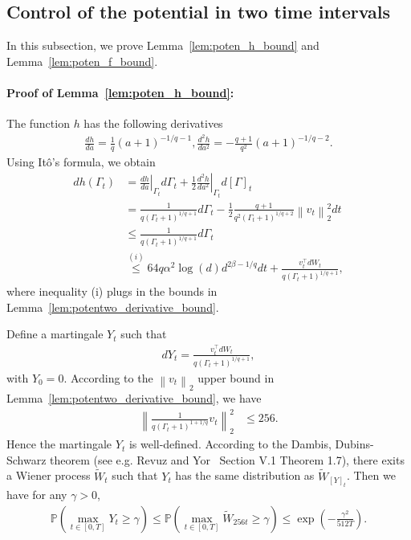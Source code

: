 \documentclass[11pt,twoside]{article}
\newcommand{\potentwo}{\Gamma}
\theoremstyle{named}
\theoremstyle{plain}
\newcommand{\vecnorm}[2]{\left\| #1\right\|_{#2}}
\newcommand{\Prob}{\ensuremath{{\mathbb{P}}}}
\newcommand{\usedim}{\ensuremath{d}}
\newcommand{\dims}{\usedim}
\newcommand{\brackets}[1]{\left[ #1 \right]}
\newcommand{\parenth}[1]{\left( #1 \right)}
\newcommand{\tp}{^\top}
\begin{document}
\subsection{Control of the potential in two time intervals} %
\label{sub:control_the_potential_in_two_time_periods}
In this subsection, we prove Lemma~\ref{lem:poten_h_bound} and Lemma~\ref{lem:poten_f_bound}.

\paragraph{Proof of Lemma~\ref{lem:poten_h_bound}:} The function $h$ has the following derivatives
\begin{align*}
  \frac{d h}{d a} = \frac{1}{q} \parenth{a + 1}^{-1/q - 1}, \frac{d^2 h}{da^2} = -\frac{q+1}{q^2} \parenth{a + 1}^{-1/q - 2}.
\end{align*}
Using It\^o's formula, we obtain
\begin{align*}
  d h(\potentwo_t) &= \left.\frac{d h}{d a}\right|_{\potentwo_t} d\potentwo_t + \frac{1}{2} \left.\frac{d^2 h}{d a^2}\right|_{\potentwo_t} d\brackets{\potentwo}_t \\
  &= \frac{1}{q (\potentwo_t+1)^{1/q+1}} d\potentwo_t - \frac{1}{2} \frac{q+1}{q^2 (\potentwo_t+1)^{1/q+2}} \vecnorm{v_t}{2}^2 dt \\
  &\leq \frac{1}{q (\potentwo_t+1)^{1/q+1}} d\potentwo_t \\
  &\stackrel{(i)}{\leq} 64 q \alpha^2 \log(\dims) \dims^{2\beta-1/q} dt + \frac{v_t\tp dW_t}{q \parenth{\potentwo_t + 1}^{1/q+1}},
\end{align*}
where inequality (i) plugs in the bounds in Lemma~\ref{lem:potentwo_derivative_bound}.

Define a martingale $Y_t$ such that
\begin{align*}
  dY_t = \frac{v_t\tp dW_t}{q \parenth{\potentwo_t + 1}^{1/q+1}},
\end{align*}
with $Y_0 = 0$. According to the $\vecnorm{v_t}{2}$ upper bound in Lemma~\ref{lem:potentwo_derivative_bound}, we have
\begin{align*}
  \vecnorm{\frac{1}{q \parenth{\potentwo_t + 1}^{1 + 1/q}}v_t}{2}^2 &\leq 256.
\end{align*}
Hence the martingale $Y_t$ is well-defined.
According to the Dambis, Dubins-Schwarz theorem (see e.g. Revuz and Yor~\cite{revuz2013continuous} Section V.1 Theorem 1.7), there exits a Wiener process $\tilde{W}_t$ such that $Y_t$ has the same distribution as $\tilde{W}_{[Y]_t}$. Then we have for any $\gamma > 0$,
\begin{align}
  \label{eq:Y_t_tail_bound}
  \Prob \parenth{\max_{t \in [0, T]} Y_t \geq \gamma} \leq \Prob \parenth{\max_{t \in [0, T]} \tilde{W}_{256t} \geq \gamma} \leq \exp\parenth{-\frac{\gamma^2}{512 T}}.
\end{align}
\end{document}
